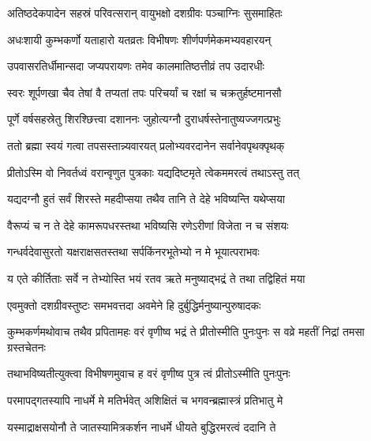 \twolineshloka
{अतिष्ठदेकपादेन सहस्रं परिवत्सरान्}
{वायुभक्षो दशग्रीवः पञ्चाग्निः सुसमाहितः}


\twolineshloka
{अधःशायी कुम्भकर्णो यताहारो यतव्रतः}
{विभीषणः शीर्णपर्णमेकमभ्यवहारयन्}


\twolineshloka
{उपवासरतिर्धीमान्सदा जप्यपरायणः}
{तमेव कालमातिष्ठत्तीव्रं तप उदारधीः}


\twolineshloka
{स्वरः शूर्पणखा चैव तेषां वै तप्यतां तपः}
{परिचर्यां च रक्षां च चक्रतुर्हष्टमानसौ}


\twolineshloka
{पूर्णे वर्षसहस्रेतु शिरश्छित्त्वा दशाननः}
{जुहोत्यग्नौ दुराधर्षस्तेनातुष्यज्जगत्प्रभुः}


\twolineshloka
{ततो ब्रह्मा स्वयं गत्वा तपसस्तान्न्यवारयत्}
{प्रलोभ्यवरदानेन सर्वानेवपृथक्पृथक्}



\twolineshloka
{प्रीतोऽस्मि वो निवर्तध्वं वरान्वृणुत पुत्रकाः}
{यद्यदिष्टमृते त्वेकममरत्वं तथाऽस्तु तत्}


\twolineshloka
{यद्यदग्नौ हुतं सर्वं शिरस्ते महदीप्सया}
{तथैव तानि ते देहे भविष्यन्ति यथेप्सया}


\twolineshloka
{वैरूप्यं च न ते देहे कामरूपधरस्तथा}
{भविष्यसि रणेऽरीणां विजेता न च संशयः}



\twolineshloka
{गन्धर्वदेवासुरतो यक्षराक्षसतस्तथा}
{सर्पकिंनरभूतेभ्यो न मे भूयात्पराभवः}



\twolineshloka
{य एते कीर्तिताः सर्वे न तेभ्योस्ति भयं रतव}
{ऋते मनुष्याद्भद्रं ते तथा तद्विहितं मया}



\twolineshloka
{एवमुक्तो दशग्रीवस्तुष्टः समभवत्तदा}
{अवमेने हि दुर्बुद्धिर्मनुष्यान्पुरुषादकः}


\threelineshloka
{कुम्भकर्णमथोवाच तथैव प्रपितामहः}
{वरं वृणीष्व भद्रं ते प्रीतोस्मीति पुनःपुनः}
{स वव्रे महतीं निद्रां तमसा ग्रस्तचेतनः}


\twolineshloka
{तथाभविष्यतीत्युक्त्वा विभीषणमुवाच ह}
{वरं वृणीष्व पुत्र त्वं प्रीतोऽस्मीति पुनःपुनः}



\twolineshloka
{परमापद्गतस्यापि नाधर्मे मे मतिर्भवेत्}
{अशिक्षितं च भगवन्ब्रह्मास्त्रं प्रतिभातु मे}



\twolineshloka
{यस्माद्राक्षसयोनौ ते जातस्यामित्रकर्शन}
{नाधर्मे धीयते बुद्धिरमरत्वं ददानि ते}

